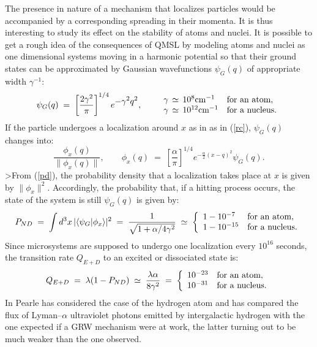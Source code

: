 \documentclass[10pt,a4paper]{article}
\begin{document}
The presence in nature of a mechanism that localizes particles
would be accompanied by a corresponding spreading in their
momenta. It is thus interesting to study its effect on the
stability of atoms and nuclei. It is possible to get a rough idea
of the consequences of QMSL by modeling atoms and nuclei as one
dimensional systems moving in a harmonic potential so that their
ground states can be approximated by Gaussian wavefunctions
$\psi_{G}(q)$ of appropriate width $\gamma^{-1}$:
\begin{equation}
\psi_{G}(q) \; = \; \left[\frac{2\gamma^{2}}{\pi}\right]^{1/4}
e^{\displaystyle -\gamma^{2}q^{2}}, \qquad
\begin{array}{ll}
\gamma \, \simeq \, 10^{8} \makebox{cm}^{-1} & \makebox{for an
atom}, \\
\gamma \, \simeq \, 10^{12} \makebox{cm}^{-1} & \makebox{for a
nucleus}.
\end{array}
\end{equation}
If the particle undergoes a localization around $x$ as in as in
(\ref{rc}), $\psi_{G}(q)$ changes into:
\begin{equation}
\frac{\phi_{x}(q)}{\|\phi_{x}(q)\|}, \qquad \phi_{x}(q) \; = \;
\left[\frac{\alpha}{\pi}\right]^{1/4} e^{\displaystyle
-\frac{\alpha}{2}(x - q)^{2}} \psi_{G}(q).
\end{equation}
>From (\ref{pd}), the probability density that a localization takes
place at $x$ is given by $\|\phi_{x}\|^2$. Accordingly, the
probability that, if a hitting process occurs, the state of the
system is still $\psi_{G}(q)$ is given by:
\begin{equation}
P_{ND} \; = \; \int d^{3}x\, |\langle \psi_{G}|\phi_{x}
\rangle|^{2} \; = \; \frac{1}{\sqrt{1+ \alpha/4\gamma^{2}}} \;
\simeq \; \left\{
\begin{array}{ll}
1 - 10^{-7} & \makebox{for an atom}, \\
1 - 10^{-15} & \makebox{for a nucleus}.
\end{array} \right.
\end{equation}
Since microsystems are supposed to undergo one localization every
$10^{16}$ seconds, the transition rate $Q_{E+D}$ to an excited or
dissociated state is:
\begin{equation} \label{pdkt}
Q_{E+D} \; = \; \lambda (1 - P_{ND}) \; \simeq \; \frac{\lambda
\alpha}{8\gamma^{2}} \; = \; \left\{
\begin{array}{ll}
10^{-23} & \makebox{for an atom}, \\
10^{-31} & \makebox{for a nucleus}.
\end{array} \right.
\end{equation}
In \cite{prc} Pearle has considered the case of the hydrogen atom and
has compared the flux of Lyman--$\alpha$ ultraviolet photons emitted
by intergalactic hydrogen with the one expected if a GRW mechanism
were at work, the latter turning out to be much weaker than the
one observed.
\end{document}

